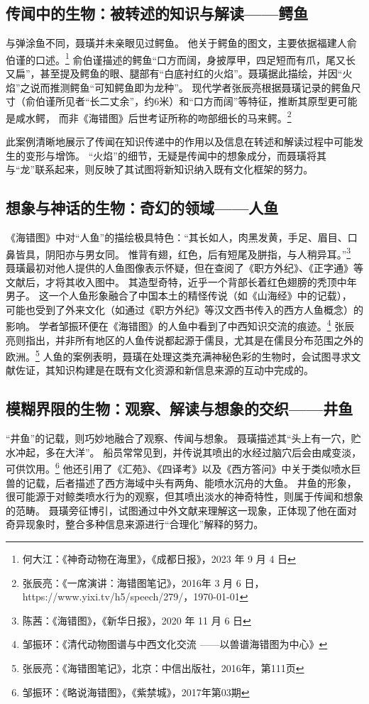 \documentclass{source/Paper}
\begin{document}
\subsection{传闻中的生物：被转述的知识与解读——鳄鱼}
与弹涂鱼不同，聂璜并未亲眼见过鳄鱼。
他关于鳄鱼的图文，主要依据福建人俞伯谨的口述。\footnote{何大江：《神奇动物在海里》，《成都日报》，2023 年 9 月 4 日}
俞伯谨描述的鳄鱼“口方而阔，身披厚甲，四足短而有爪，尾又长又扁”，甚至提及鳄鱼的眼、腿部有“白底衬红的火焰”。聂璜据此描绘，并因“火焰”之说而推测鳄鱼“可知鳄鱼即为龙种”。
现代学者张辰亮根据聂璜记录的鳄鱼尺寸（俞伯谨所见者“长二丈余”，约6米）和“口方而阔”等特征，推断其原型更可能是咸水鳄，
而非《海错图》后世考证所称的吻部细长的马来鳄。\footnote{张辰亮：《一席演讲：海错图笔记》，2016年 3 月 6 日，https://www.yixi.tv/h5/speech/279/，\today}

此案例清晰地展示了传闻在知识传递中的作用以及信息在转述和解读过程中可能发生的变形与增饰。
“火焰”的细节，无疑是传闻中的想象成分，而聂璜将其与“龙”联系起来，则反映了其试图将新知识纳入既有文化框架的努力。
\subsection{想象与神话的生物：奇幻的领域——人鱼}
《海错图》中对“人鱼”的描绘极具特色：“其长如人，肉黑发黄，手足、眉目、口鼻皆具，阴阳亦与男女同。
惟背有翅，红色，后有短尾及胼指，与人稍异耳。”\footnote{陈茜：《海错图》，《新华日报》，2020 年 11 月 6 日}
聂璜最初对他人提供的人鱼图像表示怀疑，但在查阅了《职方外纪》、《正字通》等文献后，才将其收入图中。
其造型奇特，近乎一个背部长着红色翅膀的秃顶中年男子。
这一个人鱼形象融合了中国本土的精怪传说（如《山海经》中的记载），
可能也受到了外来文化（如通过《职方外纪》等汉文西书传入的西方人鱼概念）的影响。
学者邹振环便在《海错图》的人鱼中看到了中西知识交流的痕迹。\footnote{邹振环：《清代动物图谱与中西文化交流 ——以\textlangle 兽谱\textrangle \textlangle 海错图\textrangle 为中心》}
张辰亮则指出，并非所有地区的人鱼传说都起源于儒艮，尤其是在儒艮分布范围之外的欧洲。\footnote{张辰亮：《海错图笔记》，北京：中信出版社，2016年，第111页}
人鱼的案例表明，聂璜在处理这类充满神秘色彩的生物时，会试图寻求文献佐证，其知识构建是在既有文化资源和新信息来源的互动中完成的。
\subsection{模糊界限的生物：观察、解读与想象的交织——井鱼}
“井鱼”的记载，则巧妙地融合了观察、传闻与想象。
聂璜描述其“头上有一穴，贮水冲起，多在大洋”。
船员常常见到，并传说其喷出的水经过脑穴后会由咸变淡，可供饮用。\footnote{邹振环：《略说海错图》，《紫禁城》，2017年第03期}
他还引用了《汇苑》、《四译考》以及《西方答问》中关于类似喷水巨兽的记载，后者描述了西方海域中头有两角、能喷水沉舟的大鱼。
井鱼的形象，很可能源于对鲸类喷水行为的观察，但其喷出淡水的神奇特性，则属于传闻和想象的范畴。
聂璜旁征博引，试图通过中外文献来理解这一现象，正体现了他在面对奇异现象时，整合多种信息来源进行“合理化”解释的努力。
\end{document}
